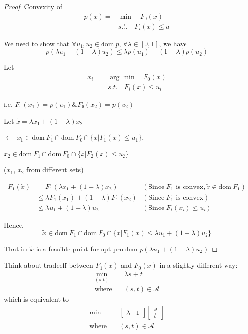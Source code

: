 \begin{proof}
	Convexity of
	\begin{align*}
		p(x) = &\min \quad F_0(x)\\
		&s.t. \quad F_i(x) \leq u
	\end{align*}
	
	We need to show that $\forall u_1, u_2\in \text{dom}\ p$, $\forall \lambda\in [0,1]$, we have
	$$p(\lambda u_1 + (1-\lambda)u_2) \leq \lambda  p(u_1) + (1-\lambda)p(u_2)$$
	
	Let
	\begin{align*}
		x_i = &\arg \min \quad F_0(x)\\
		&s.t. \quad F_i(x) \leq u_i
	\end{align*}
	
	i.e. $F_0(x_1) = p(u_1)\& F_0(x_2) =p(u_2)$
	
	Let $\tilde{x} = \lambda x_1 + (1-\lambda)x_2$ 
	
	$\leftarrow$ $x_1\in \text{dom}\ F_1\cap \text{dom}\ F_0\cap \{x\vert F_1(x)\leq u_1 \}$, 
	
	$x_2\in \text{dom}\ F_1\cap \text{dom}\ F_0\cap \{x\vert F_2(x)\leq u_2 \}$
	
	($x_1$, $x_2$ from different sets)
	
	\begin{align*}
		F_1(\tilde{x}) 
		&= F_1(\lambda x_1 + (1-\lambda)x_2) &(\text{Since } F_1\text{ is convex}, \tilde{x}\in \text{dom}\ F_1)\\
		&\leq \lambda F_1(x_1) + (1-\lambda)F_1(x_2) &(\text{Since } F_1 \text{ is convex})\\
		&\leq \lambda u_1 + (1-\lambda)u_2 &(\text{Since } F_i(x_i) \leq u_i)
	\end{align*}
	
	Hence, 
	\begin{equation*}
		\tilde{x} \in \text{dom}\ F_1 \cap \text{dom}\ F_0 \cap \{x\vert F_1(x)\leq \lambda u_1 + (1-\lambda)u_2 \}
	\end{equation*}
	
	
	That is: $\tilde{x}$ is a feasible point for opt problem $p(\lambda u_1+(1-\lambda)u_2)$	
\end{proof}

Think about tradeoff between $F_1(x)$ and $F_0(x)$ in a slightly different way:
\begin{align*}
	\min_{(s,t)} \quad&\lambda s + t\\
	\text{where} \quad&(s,t) \in \mathcal{A}
\end{align*}
which is equivalent to
\begin{align*}
	\min \quad&\begin{bmatrix}
		\lambda &1 
	\end{bmatrix}\begin{bmatrix}
		s\\
		t
	\end{bmatrix}\\
	\text{where} \quad &(s,t) \in \mathcal{A}
\end{align*}

